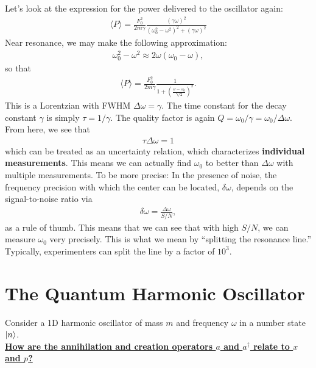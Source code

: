 \documentclass{book}
\theoremstyle{definition}
\newcommand{\f}[2]{\frac{#1}{#2}}
\newcommand{\lp}{\left(}
\newcommand{\rp}{\right)}
\begin{document}
Let's look at the expression for the power delivered to the oscillator again:
\begin{align*}
{\langle P \rangle = \f{F_0^2 }{2m\gamma}\f{(\gamma\omega)^2}{(\omega_0^2 - \omega^2)^2 + (\gamma \omega)^2}}
\end{align*}
Near resonance, we may make the following approximation:
\begin{align*}
\omega_0^2 - \omega^2 \approx 2\omega(\omega_0  - \omega),
\end{align*}
so that 
\begin{align*}
\langle P \rangle = \f{F_0^2 }{2m\gamma} \f{1}{1 + \lp \f{\omega - \omega_0}{\gamma/2}\rp ^2}.
\end{align*}
This is a Lorentzian with FWHM $\Delta \omega = \gamma$. The time constant for the decay constant $\gamma$ is simply $\tau = 1/\gamma$. The quality factor is again $Q = \omega_0  / \gamma = \omega_0 / \Delta \omega$. From here, we see that
\begin{align*}
\tau \Delta \omega = 1
\end{align*}
which can be treated as an uncertainty relation, which characterizes \textbf{individual measurements}. This means we can actually find $\omega_0$ to better than $\Delta \omega$ with multiple measurements. To be more precise: In the presence of noise, the frequency precision with which the center can be located, $\delta \omega$, depends on the signal-to-noise ratio via
\begin{align*}
\delta \omega = \f{\Delta \omega}{S/N},
\end{align*}
as a rule of thumb. This means that we can see that with high $S/N$, we can measure $\omega_0$ very precisely. This is what we mean by ``splitting the resonance line.'' Typically, experimenters can split the line by a factor of $10^3$. 


\section{The Quantum Harmonic Oscillator}


Consider a 1D harmonic oscillator of mass $m$ and frequency $\omega$ in a number state $\ket{n}$. \\




\noindent \textbf{\underline{How are the annihilation and creation operators $ a$ and $ a^\dagger$ relate to $ x$ and $ p$?}}\\
\end{document}

